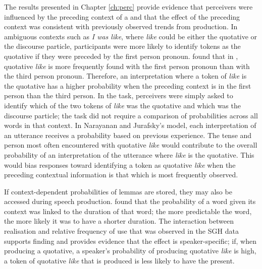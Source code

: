 The  results presented in Chapter \ref{ch:perc} provide evidence that perceivers were influenced by the preceding context of a  and that the effect of the preceding context was consistent with previously observed trends from production.  In ambiguous contexts such as \textit{I was like}, where \textit{like} could be either the quotative or the discourse particle, participants were more likely to identify tokens as the quotative if they were preceded by the first person pronoun.  \citet{buchstallerdarcy2009} found that in , quotative \textit{like} is more frequently found with the first person pronoun than with the third person pronoun.  Therefore, an interpretation where a token of \textit{like} is the quotative has a higher probability when the preceding context is in the first person than the third person.  In the task, perceivers were simply asked to identify which of the two tokens of \textit{like} was the quotative and which was the discourse particle; the task did not require a comparison of probabilities across all words in that context.  In Narayanan and Jurafsky's model, each interpretation of an utterance receives a probability based on previous experience.  The tense and person most often encountered with quotative \textit{like} would contribute to the overall probability of an interpretation of the utterance where \textit{like} is the quotative.  This would bias responses toward identifying a token as quotative \textit{like} when the preceding contextual information is that which is most frequently observed.

If context-dependent probabilities of lemmas are stored, they may also be accessed during speech production.  \citet{jurafskyetal2002} found that the probability of a word given its context was linked to the duration of that word; the more predictable the word, the more likely it was to have a shorter duration.  The interaction between  realisation and relative frequency of use that was observed in the SGH data supports  finding and provides evidence that the effect is speaker-specific; if, when producing a quotative, a speaker's probability of producing quotative \textit{like} is high, a token of quotative \textit{like} that is produced is less likely to have the  present.  





